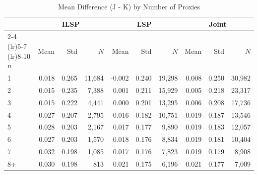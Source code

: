 \begin{table}[htbp]
\centering
\caption{Mean Difference (J - K) by Number of Proxies}
\label{tab:mean_diff_by_nproxies}
\begin{tabular}{l rrr rrr rrr}
\toprule
& \multicolumn{3}{c}{ILSP} & \multicolumn{3}{c}{LSP} & \multicolumn{3}{c}{Joint} \\
\cmidrule(lr){2-4} \cmidrule(lr){5-7} \cmidrule(lr){8-10}
$n$ & Mean & Std & $N$ & Mean & Std & $N$ & Mean & Std & $N$ \\
\midrule
1 & 0.018 & 0.265 & 11,684 & -0.002 & 0.240 & 19,298 & 0.008 & 0.250 & 30,982 \\
2 & 0.015 & 0.235 & 7,388 & 0.001 & 0.211 & 15,929 & 0.005 & 0.218 & 23,317 \\
3 & 0.015 & 0.222 & 4,441 & 0.000 & 0.201 & 13,295 & 0.006 & 0.208 & 17,736 \\
4 & 0.027 & 0.207 & 2,795 & 0.016 & 0.182 & 10,751 & 0.019 & 0.187 & 13,546 \\
5 & 0.028 & 0.203 & 2,167 & 0.017 & 0.177 & 9,890 & 0.019 & 0.183 & 12,057 \\
6 & 0.027 & 0.203 & 1,570 & 0.018 & 0.176 & 8,834 & 0.019 & 0.181 & 10,404 \\
7 & 0.032 & 0.198 & 1,085 & 0.017 & 0.176 & 7,823 & 0.019 & 0.179 & 8,908 \\
8+ & 0.030 & 0.198 & 813 & 0.021 & 0.175 & 6,196 & 0.021 & 0.177 & 7,009 \\
\bottomrule
\end{tabular}
\end{table}